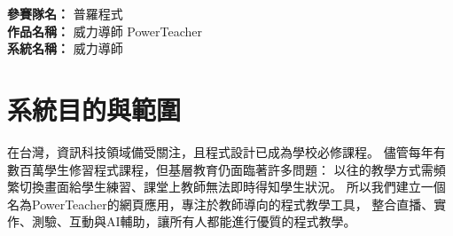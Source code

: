 \documentclass[12pt]{article}
\begin{document}
\date{}
\usetikzlibrary{automata, positioning, arrows}
{}
\renewcommand{\arraystretch}{1.45}

\noindent
\textbf{參賽隊名：} 普羅程式 \\
\textbf{作品名稱：} 威力導師 PowerTeacher \\
\textbf{系統名稱：} 威力導師

\section{系統目的與範圍}

在台灣，資訊科技領域備受關注，且程式設計已成為學校必修課程。
儘管每年有數百萬學生修習程式課程，但基層教育仍面臨著許多問題：
以往的教學方式需頻繁切換畫面給學生練習、課堂上教師無法即時得知學生狀況。
所以我們建立一個名為PowerTeacher的網頁應用，專注於教師導向的程式教學工具，
整合直播、實作、測驗、互動與AI輔助，讓所有人都能進行優質的程式教學。
\end{document}
